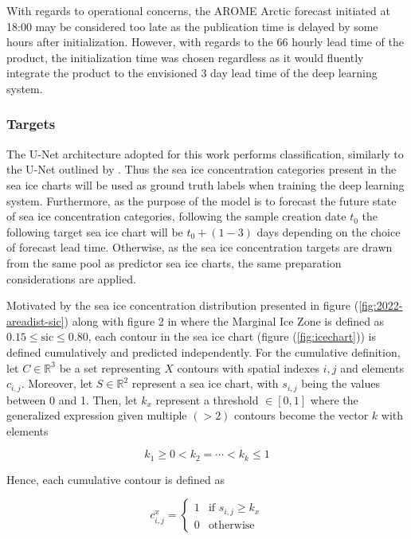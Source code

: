 \documentclass[../main/thesis]{subfiles}
\begin{document}
With regards to operational concerns, the AROME Arctic forecast initiated at 18:00 may be considered too late as the publication time is delayed by some hours after initialization. However, with regards to the 66 hourly lead time of the product, the initialization time was chosen regardless as it would fluently integrate the product to the envisioned 3 day lead time of the deep learning system.

\subsubsection{Targets}
\label{sec:data_targets}
The U-Net architecture adopted for this work performs classification, similarly to the U-Net outlined by \citet{Ronneberger2015}. Thus the sea ice concentration categories present in the sea ice charts \citep{Dinessen2020} will be used as ground truth labels when training the deep learning system. Furthermore, as the purpose of the model is to forecast the future state of sea ice concentration categories, following the sample creation date $t_0$ the following target sea ice chart will be $t_0 + (1 - 3)$ days depending on the choice of forecast lead time. Otherwise, as the sea ice concentration targets are drawn from the same pool as predictor sea ice charts, the same preparation considerations are applied.

Motivated by the sea ice concentration distribution presented in figure (\ref{fig:2022-areadist-sic}) along with figure 2 in \citet{Strong2012} where the Marginal Ice Zone is defined as $0.15 \leq \text{sic} \leq 0.80$, each contour in the sea ice chart (figure (\ref{fig:icechart})) is defined cumulatively and predicted independently. For the cumulative definition, let $C \in \mathbb{R}^3$ be a set representing $X$ contours with spatial indexes $i,j$ and elements $c_{i,j}$. Moreover, let $S \in \mathbb{R}^2$ represent a sea ice chart, with $s_{i,j}$ being the values between 0 and 1. Then, let $k_x$ represent a threshold $\in [0,1]$ where the generalized expression given multiple $(>2)$ contours become the vector $k$ with elements

\begin{equation}
    k_1 \geq 0 < k_2 = \cdots < k_k \leq 1
\end{equation}

Hence, each cumulative contour is defined as

\begin{equation}
    \label{eq:cum_contour}
    c_{i,j}^x = \begin{cases}
        1 & \text{if } s_{i,j} \geq k_x \\
        0 & \text{otherwise}
    \end{cases}
\end{equation}
\end{document}
